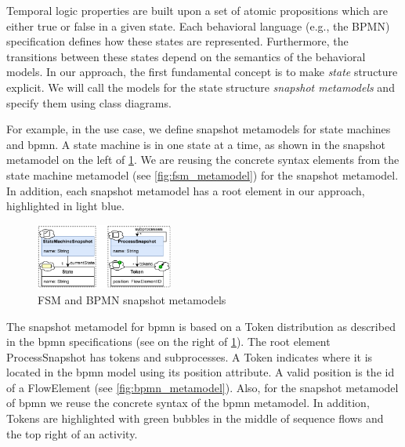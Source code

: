 \documentclass{jot}
\begin{document}
Temporal logic properties are built upon a set of atomic propositions which are either true or false in a given state.
Each behavioral language (e.g., the BPMN) specification defines how these states are represented.
Furthermore, the transitions between these states depend on the semantics of the behavioral models.
In our approach, the first fundamental concept is to make \textit{state} structure explicit.
We will call the models for the state structure \textit{snapshot metamodels} and specify them using class diagrams.

For example, in the use case, we define snapshot metamodels for state machines and \gls*{bpmn}.
A state machine is in one state at a time, as shown in the snapshot metamodel on the left of \cref{fig:snapshot_metamodels}.
We are reusing the concrete syntax elements from the state machine metamodel (see \cref{fig:fsm_metamodel}) for the snapshot metamodel.
In addition, each snapshot metamodel has a root element in our approach, highlighted in light blue.
\begin{figure}[h]
    \centering
    \includegraphics[width=0.4\textwidth]{figures/snapshot_metamodels.pdf}
    \caption{FSM and BPMN snapshot metamodels}
    \label{fig:snapshot_metamodels}
\end{figure}

The snapshot metamodel for \gls*{bpmn} is based on a \textsf{Token} distribution as described in the \gls*{bpmn} specifications \cite{objectmanagementgroupBusinessProcessModel2013} (see on the right of \cref{fig:snapshot_metamodels}).
The root element \textsf{ProcessSnapshot} has \textsf{tokens} and \textsf{subprocesses}.
A \textsf{Token} indicates where it is located in the \gls*{bpmn} model using its \textsf{position} attribute.
A valid \textsf{position} is the \textsf{id} of a \textsf{FlowElement} (see \cref{fig:bpmn_metamodel}).
Also, for the snapshot metamodel of \gls*{bpmn} we reuse the concrete syntax of the \gls*{bpmn} metamodel.
In addition, \textsf{Token}s are highlighted with green bubbles in the middle of sequence flows and the top right of an activity.
\end{document}
